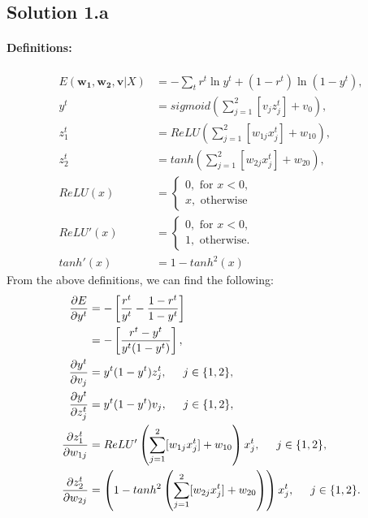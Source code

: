 \subsection*{Solution 1.a}
\paragraph{Definitions:}
\begin{equation}\label{eq:definitions}
	\begin{split}
		E(\boldsymbol{w_1}, \boldsymbol{w_2}, \boldsymbol{v} | X) &= - \sum_t r^t\ln y^t + (1-r^t)\ln (1-y^t),\\
		y^t &= sigmoid\left(\sum_{j=1}^{2}[v_jz_j^t] + v_0\right),\\
		z_1^t &= ReLU\left(\sum_{j=1}^{2}[w_{1j}x_j^t]+w_{10}\right),\\
		z_2^t &= tanh\left(\sum_{j=1}^{2}[w_{2j}x_j^t]+w_{20}\right),\\
		ReLU(x) &= \begin{cases}
			0, \text{ for } x<0,\\
			x, \text{ otherwise}
		\end{cases}\\
		ReLU'(x) &= \begin{cases}
			0, \text{ for } x<0,\\
			1, \text{ otherwise}.
		\end{cases}\\
		tanh'(x) &= 1-tanh^2(x)
		\end{split}
\end{equation}
From the above definitions, we can find the following:
\begin{equation}
	\begin{split}
		\frac{\partial E}{\partial y^t} &= -\left[\frac{r^t}{y^t} - \frac{1-r^t}{1-y^t}\right]\\
		&= -\left[\frac{r^t-y^t}{y^t(1-y^t)}\right],\\
		\frac{\partial y^t}{\partial v_j} &= y^t(1-y^t)z_j^t,\hspace*{0.5cm} j\in \{1,2\},\\
		\frac{\partial y^t}{\partial z_j^t} &= y^t(1-y^t)v_j,\hspace*{0.5cm} j\in \{1,2\},\\ 
		\frac{\partial z_1^t}{\partial w_{1j}} &= ReLU'\left(\sum_{j=1}^{2}[w_{1j}x_j^t]+w_{10}\right)x_j^t,\hspace*{0.5cm} j\in \{1,2\},\\
		\frac{\partial z_2^t}{\partial w_{2j}} &= \left(1-tanh^2\left(\sum_{j=1}^{2}[w_{2j}x_j^t]+w_{20}\right)\right)x_j^t,\hspace*{0.5cm} j\in \{1,2\}.
	\end{split}
\end{equation}
